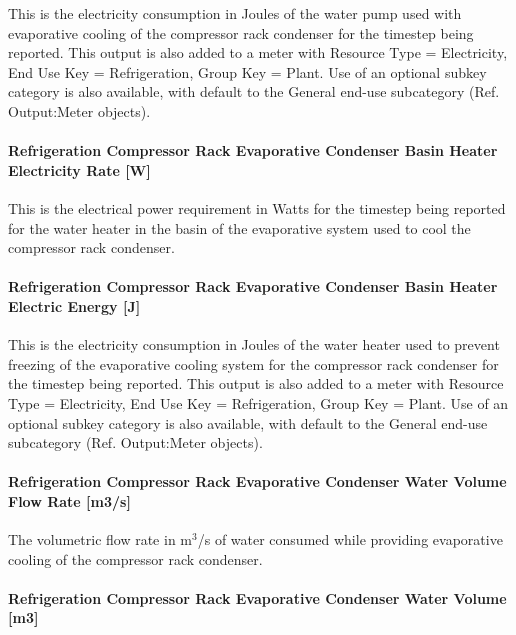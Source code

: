 This is the electricity consumption in Joules of the water pump used with evaporative cooling of the compressor rack condenser for the timestep being reported. This output is also added to a meter with Resource Type = Electricity, End Use Key = Refrigeration, Group Key = Plant. Use of an optional subkey category is also available, with default to the General end-use subcategory (Ref. Output:Meter objects).

\paragraph{Refrigeration Compressor Rack Evaporative Condenser Basin Heater Electricity Rate {[}W{]}}\label{refrigeration-compressor-rack-evaporative-condenser-basin-heater-electric-power-w}

This is the electrical power requirement in Watts for the timestep being reported for the water heater in the basin of the evaporative system used to cool the compressor rack condenser.

\paragraph{Refrigeration Compressor Rack Evaporative Condenser Basin Heater Electric Energy {[}J{]}}\label{refrigeration-compressor-rack-evaporative-condenser-basin-heater-electric-energy-j}

This is the electricity consumption in Joules of the water heater used to prevent freezing of the evaporative cooling system for the compressor rack condenser for the timestep being reported. This output is also added to a meter with Resource Type = Electricity, End Use Key = Refrigeration, Group Key = Plant. Use of an optional subkey category is also available, with default to the General end-use subcategory (Ref. Output:Meter objects).

\paragraph{Refrigeration Compressor Rack Evaporative Condenser Water Volume Flow Rate {[}m3/s{]}}\label{refrigeration-compressor-rack-evaporative-condenser-water-volume-flow-rate-m3s}

The volumetric flow rate in m\(^{3}\)/s of water consumed while providing evaporative cooling of the compressor rack condenser.

\paragraph{Refrigeration Compressor Rack Evaporative Condenser Water Volume {[}m3{]}}\label{refrigeration-compressor-rack-evaporative-condenser-water-volume-m3}

